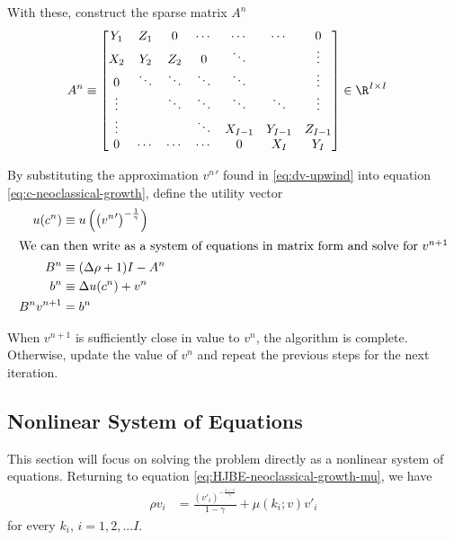 \documentclass[11pt]{etk-article}
\begin{document}
With these, construct the sparse matrix $A^n$
\begin{align}
A^n &\equiv \begin{bmatrix}
Y_1 & Z_1 & 0 & \cdots & \cdots & \cdots & 0 \\
X_2 & Y_2 & Z_2 & 0 & \ddots& & \vdots \\
0 & \ddots & \ddots & \ddots & \ddots &  & \vdots \\
\vdots & &\ddots & \ddots & \ddots & \ddots  & \vdots \\
\vdots & & & \ddots & X_{I-1} & Y_{I-1}  & Z_{I-1} \\
0 & \cdots & \cdots & \cdots & 0 & X_I & Y_I\\
\end{bmatrix}\in\R^{I\times I}\label{eq:A}
\end{align}

By substituting the approximation ${v^{n}}'$ found in \cref{eq:dv-upwind} into equation \cref{eq:c-neoclassical-growth}, define the utility vector
\begin{align}
u(c^n) &\equiv u\left(\left({v^n}'\right)^{-\frac{1}{\gamma}}\right)\\
\intertext{We can then write as a system of equations in matrix form and solve for $v^{n+1}$}
B^n &\equiv (\Delta \rho + 1)I - A^n\\
b^n &\equiv \Delta u(c^n) + v^n\\
B^{n}v^{n+1} &= {b^n}
\end{align}



When $v^{n+1}$ is sufficiently close in value to $v^n$, the algorithm is complete. Otherwise, update the value of $v^n$ and repeat the previous steps for the next iteration. 


\subsection{Nonlinear System of Equations}
This section will focus on solving the problem directly as a nonlinear system of equations. Returning to equation \cref{eq:HJBE-neoclassical-growth-mu}, we have 
\begin{align}
\rho v_i &= \frac{\left(v'_i\right)^{-\frac{1-\gamma}{\gamma}}}{1-\gamma} + \mu(k_i;v) v'_i
\end{align}
for every $k_i$, $i=1,2,...I$.


\end{document}
